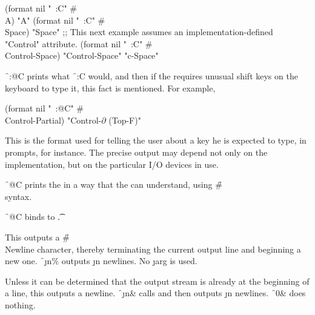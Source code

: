 \code
 (format nil "~:C" #\\A) \EV "A"
 (format nil "~:C" #\\Space) \EV "Space"
;; This next example assumes an implementation-defined "Control" attribute.
 (format nil "~:C" #\\Control-Space)
\EV "Control-Space"
\OV "c-Space"
\endcode

\f{~:@C} prints what \f{~:C} would, and then
if the  requires unusual shift keys on the keyboard to type it,
this fact is mentioned.  For example,

\begingroup
\def\Partial{$\partial$}
\code
 (format nil "~:@C" #\\Control-Partial) \EV "Control-{\Partial} (Top-F)"  
\endcode
\endgroup

This is the format used for telling the user about a key he is expected to type,
in prompts, for instance.  The precise output may depend not only
on the implementation, but on the particular I/O devices in use.
                           
\f{~@C} 
prints the  in a way that the  can understand,
using \f{\#\\} syntax.

\f{~@C}  binds  to \t.

\endsubsubsection%



This outputs a \f{\#\\Newline} character, thereby terminating the current
output line and beginning a new one.
\f{~\j{n}\%} outputs \j{n} newlines.
No \j{arg} is used.  

\endsubsubsection%



Unless it can be determined that the output stream
is already at the beginning of a line,
this outputs a newline.
\f{~\j{n}\&} calls 
and then outputs \j{n} newlines.
\f{~0\&} does nothing.

\endsubsubsection%

